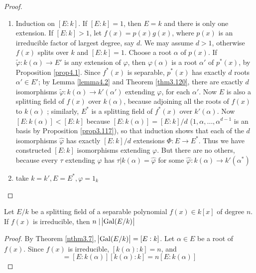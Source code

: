 \documentclass[11pt]{article}
\begin{document}
\begin{proof}
\begin{enumerate}
\item Induction on \([E:k]\). If \([E:k]=1\), then \(E=k\) and there is only one
extension. If \([E:k]>1\), let \(f(x)=p(x)g(x)\), where \(p(x)\) is an
irreducible factor of largest degree, say \(d\). We may assume \(d>1\),
otherwise \(f(x)\) splits over \(k\) and \([E:k]=1\). Choose a root \(\alpha\) of
\(p(x)\). If \(\widetilde{\varphi}:k(\alpha)\to E'\) is any extension of \(\varphi\), then
\(\varphi(\alpha)\) is a root \(\alpha'\) of \(p^*(x)\), by Proposition \ref{prop4.1}.
Since \(f^*(x)\) is separable, \(p^*(x)\) has exactly \(d\) roots
\(\alpha'\in E'\); by Lemma \ref{lemma4.2} and Theorem \ref{thm3.120}, there
are exactly \(d\) isomorphisms \(\widetilde{\varphi}:k(\alpha)\to k'(\alpha')\)
extending \(\varphi\), for each \(\alpha'\). Now \(E\) is also a splitting field of
\(f(x)\) over \(k(\alpha)\), because adjoining all the roots of \(f(x)\) to
\(k(\alpha)\) ; similarly, \(E^*\) is a splitting field of \(f^*(x)\) over
\(k'(\alpha)\). Now \([E:k(\alpha)]<[E:k]\) because \([E:k(\alpha)]=[E:k]/d\)
(\(1,\alpha,\dots,\alpha^{d-1}\) is an basis by Proposition \ref{prop3.117}), so that
induction shows that each of the \(d\) isomorphisms \(\widehat{\varphi}\) has
exactly \([E:k]/d\) extensions \(\Phi:E\to E^*\). Thus we have constructed
\([E:k]\) isomorphisms extending \(\varphi\). But there are no others, because every
\(\tau\) extending \(\varphi\) has \(\tau|k(\alpha)=\widehat{\varphi}\) for some 
\(\widehat{\varphi}:k(\alpha)\to k'(\alpha^*)\)
\item take \(k=k',E=E^*,\varphi=1_k\)
\end{enumerate}
\end{proof}

\begin{corollary}[]
\label{ncor3.9}
Let \(E/k\) be a splitting field of a separable polynomial \(f(x)\in k[x]\)
of degree \(n\). If \(f(x)\) is irreducible, then \(n\mid\abs{\operatorname{Gal}(E/k)}\)
\end{corollary}

\begin{proof}
By Theorem \ref{nthm3.7}, \(\abs{\operatorname{Gal}(E/k)}=[E:k]\). Let \(\alpha\in E\) be a
root of \(f(x)\). Since \(f(x)\) is irreducible, \([k(\alpha):k]=n\), and 
\begin{equation*}
[E:k]=[E:k(\alpha)][k(\alpha):k]=n[E:k(\alpha)]
\end{equation*}
\end{proof}
\end{document}
